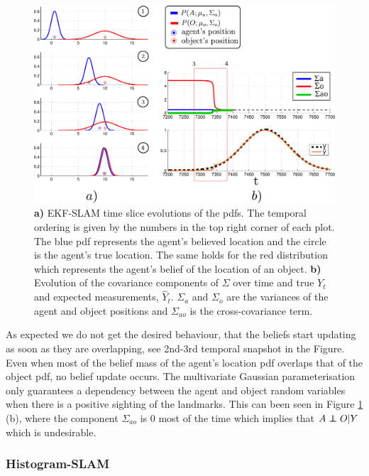 \begin{figure}
\centering
 \includegraphics[width=\textwidth]{./ch5-MLMF/Figures/explenation/Figure3.pdf}
\caption{\textbf{a)} EKF-SLAM time slice evolutions of the pdfs. 
The temporal ordering is given by the numbers in the top right corner of each plot.
The blue pdf represents the agent's believed location and the circle is the agent's true location. The same holds 
for the red distribution which represents the agent's belief of the location of an object.
\textbf{b)} Evolution of the covariance components of $\Sigma$ over time and true $Y_t$ and expected measurements,  $\hat{Y}_t$. 
$\Sigma_a$ and $\Sigma_o$ are the variances of the agent and object positions and $\Sigma_{ao}$ is the cross-covariance 
term.}
\label{fig:EKF-SLAM}
\end{figure}

As expected we do not get the desired behaviour, that the beliefs start updating as soon as they are overlapping, 
see 2nd-3rd temporal snapshot in the Figure. 
Even when most of the belief mass of the agent's location pdf overlaps that of the object pdf, no belief update occurs. 
The multivariate Gaussian parameterisation only guarantees a dependency between the agent and object random variables 
when there is a positive sighting of the landmarks.  This can been seen in Figure \ref{fig:EKF-SLAM} (b),
where the component $\Sigma_{ao}$ is 0 most of the time which implies that $A \independent O | Y$ which is undesirable. 

\subsubsection{Histogram-SLAM}\label{sec:Discrete}

